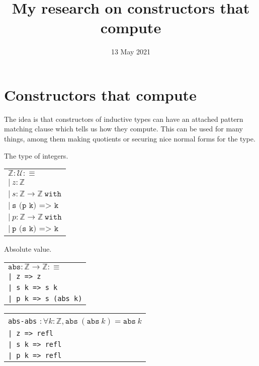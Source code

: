 \documentclass[11pt]{article}
\title{My research on constructors that compute}
\date{13 May 2021}
\theoremstyle{definition}
\newcommand{\txt}[1]{\texttt{#1}}
\newcommand{\text}[1]{\texttt{#1}}
\renewcommand{\(}{\left(}
\renewcommand{\)}{\right)}
\newcommand{\defn}{:\equiv}
\newcommand{\U}{\mathcal{U}}
\newcommand{\refl}{\txt{refl}}
\newcommand{\ZZ}{\mathbb{Z}}
\begin{document}
\maketitle

\section{Constructors that compute}

The idea is that constructors of inductive types can have an attached pattern matching clause which tells us how they compute. This can be used for many things, among them making quotients or securing nice normal forms for the type.

\begin{center}
The type of integers.

\begin{tabular}{l}
$\ZZ : \U \defn$ \\
$ |\ z : \ZZ$ \\
$ |\ s : \ZZ \to \ZZ\ \text{with}$ \\
\qquad $|\ \text{s (p k) => k}$ \\
$ |\ p : \ZZ \to \ZZ\ \text{with}$ \\
\qquad $|\ \text{p (s k) => k}$
\end{tabular}
\end{center}

\newcommand{\abs}{\txt{abs}}

\begin{center}
Absolute value.

\begin{tabular}{l}
$\abs : \ZZ \to \ZZ \defn$ \\
\txt{| z => z} \\
\txt{| s k => s k} \\
\txt{| p k => s (abs k)}
\end{tabular}
\end{center}

\begin{center}
\begin{tabular}{l}
\txt{abs-abs} $: \forall k : \ZZ, \abs\ (\abs\ k) = \abs\ k$ \\
\txt{| z => \refl} \\
\txt{| s k => \refl} \\
\txt{| p k => \refl}
\end{tabular}
\end{center}
\end{document}
